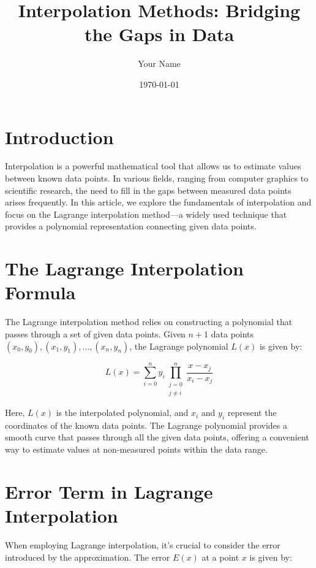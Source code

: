 \documentclass{article}
\begin{document}
\title{Interpolation Methods: Bridging the Gaps in Data}
\author{Your Name}
\date{\today}

\maketitle

\section{Introduction}

Interpolation is a powerful mathematical tool that allows us to estimate values between known data points. In various fields, ranging from computer graphics to scientific research, the need to fill in the gaps between measured data points arises frequently. In this article, we explore the fundamentals of interpolation and focus on the Lagrange interpolation method—a widely used technique that provides a polynomial representation connecting given data points.

\section{The Lagrange Interpolation Formula}

The Lagrange interpolation method relies on constructing a polynomial that passes through a set of given data points. Given \(n+1\) data points \((x_0, y_0), (x_1, y_1), \ldots, (x_n, y_n)\), the Lagrange polynomial \(L(x)\) is given by:

\begin{equation}
    L(x) = \sum_{i=0}^{n} y_i \prod_{\substack{j=0 \\ j \neq i}}^{n} \frac{x - x_j}{x_i - x_j}
\end{equation}

Here, \(L(x)\) is the interpolated polynomial, and \(x_i\) and \(y_i\) represent the coordinates of the known data points. The Lagrange polynomial provides a smooth curve that passes through all the given data points, offering a convenient way to estimate values at non-measured points within the data range.

\section{Error Term in Lagrange Interpolation}

When employing Lagrange interpolation, it's crucial to consider the error introduced by the approximation. The error \(E(x)\) at a point \(x\) is given by:
\end{document}
